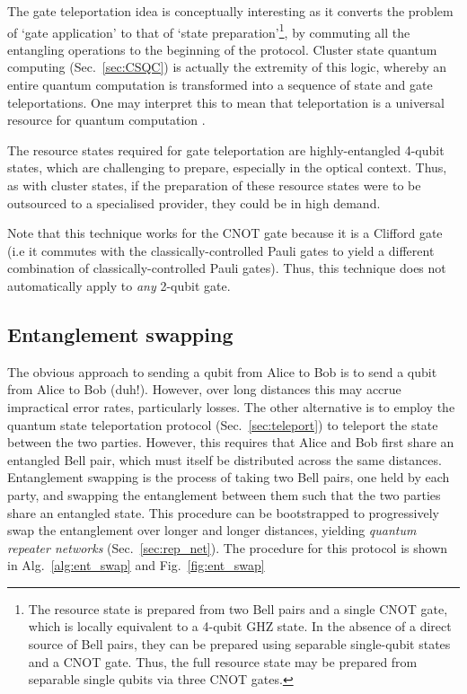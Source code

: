The gate teleportation idea is conceptually interesting as it converts the problem of `gate application' to that of `state preparation'\footnote{The resource state is prepared from two Bell pairs and a single CNOT gate, which is locally equivalent to a 4-qubit GHZ state. In the absence of a direct source of Bell pairs, they can be prepared using separable single-qubit states and a CNOT gate. Thus, the full resource state may be prepared from separable single qubits via three CNOT gates.}, by commuting all the entangling operations to the beginning of the protocol. Cluster state quantum computing (Sec.~\ref{sec:CSQC}) is actually the extremity of this logic, whereby an entire quantum computation is transformed into a sequence of state and gate teleportations. One may interpret this to mean that teleportation is a universal resource for quantum computation \cite{bib:GottesmanChuang99}.

The resource states required for gate teleportation are highly-entangled 4-qubit states, which are challenging to prepare, especially in the optical context. Thus, as with cluster states, if the preparation of these resource states were to be outsourced to a specialised provider, they could be in high demand.

Note that this technique works for the CNOT gate because it is a Clifford gate (i.e it commutes with the classically-controlled Pauli gates to yield a different combination of classically-controlled Pauli gates). Thus, this technique does not automatically apply to \textit{any} 2-qubit gate.

%
%

\subsection{Entanglement swapping} \label{sec:swapping} 

The obvious approach to sending a qubit from Alice to Bob is to send a qubit from Alice to Bob (duh!). However, over long distances this may accrue impractical error rates, particularly losses. The other alternative is to employ the quantum state teleportation protocol (Sec.~\ref{sec:teleport}) to teleport the state between the two parties. However, this requires that Alice and Bob first share an entangled Bell pair, which must itself be distributed across the same distances. Entanglement swapping \cite{???, bib:PRL_71_4287} is the process of taking two Bell pairs, one held by each party, and swapping the entanglement between them such that the two parties share an entangled state. This procedure can be bootstrapped to progressively swap the entanglement over longer and longer distances, yielding \textit{quantum repeater networks} (Sec.~\ref{sec:rep_net}). The procedure for this protocol is shown in Alg.~\ref{alg:ent_swap} and Fig.~\ref{fig:ent_swap}

